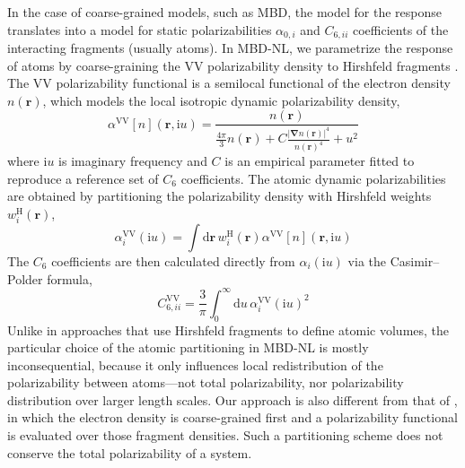 In the case of coarse-grained models, such as MBD, the model for the response translates into a model for static polarizabilities $\alpha_{0,i}$ and $C_{6,ii}$ coefficients of the interacting fragments (usually atoms).
In MBD-NL, we parametrize the response of atoms by coarse-graining the VV polarizability density to Hirshfeld fragments \citep{HirshfeldTCA77,SatoJCP09,SatoJCP10}.
The VV polarizability functional is a semilocal functional of the electron density $n(\mathbf r)$, which models the local isotropic dynamic polarizability density,
\begin{equation}
  \alpha^\text{VV}[n](\mathbf r,\mathrm iu)
    =\frac{n(\mathbf r)}{\frac{4\pi}3n(\mathbf r)
    +C\frac{{|\boldsymbol\nabla n(\mathbf r)|}^4}{n{(\mathbf r)}^4}+u^2}
  \label{eq:vv-functional}
\end{equation}
where $\mathrm iu$ is imaginary frequency and $C$ is an empirical parameter fitted to reproduce a reference set of $C_6$ coefficients.
The atomic dynamic polarizabilities are obtained by partitioning the polarizability density with Hirshfeld weights $w_i^\text{H}(\mathbf r)$,
\begin{equation}
  \alpha_i^\text{VV}(\mathrm iu)
    =\int\mathrm d\mathbf r\,w_i^\text{H}(\mathbf r)\alpha^\text{VV}[n](\mathbf r,\mathrm iu)
\end{equation}
The $C_6$ coefficients are then calculated directly from $\alpha_i(\mathrm iu)$ via the Casimir--Polder formula,
\begin{equation}
  C_{6,ii}^\text{VV}=\frac3\pi\int_0^\infty\mathrm du\,\alpha_i^\text{VV}{(\mathrm iu)}^2
\end{equation}
Unlike in approaches that use Hirshfeld fragments to define atomic volumes, the particular choice of the atomic partitioning in MBD-NL is mostly inconsequential, because it only influences local redistribution of the polarizability between atoms---not total polarizability, nor polarizability distribution over larger length scales.
Our approach is also different from that of \citet{SilvestrelliPRL08}, in which the electron density is coarse-grained first and a polarizability functional is evaluated over those fragment densities.
Such a partitioning scheme does not conserve the total polarizability of a system.


